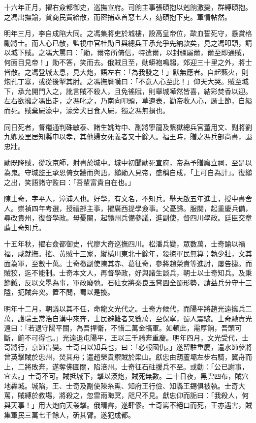 \begin{pinyinscope}
{{十六年正月，擢右僉都御史，巡撫宣府。司餉主事張碩抱以剋餉激變，群縛碩抱。之馮出撫諭，貸商民貲給散，而密捕誅首惡七人，劾碩抱下吏。軍情帖然。

明年三月，李自成陷大同。之馮集將吏於城樓，設高皇帝位，歃血誓死守，懸賞格勵將士。而人心已散，監視中官杜勛且與總兵王承允爭先納款矣，見之馮叩頭，請以城下賊。之馮大罵曰：「勛，爾帝所倚信，特遣爾，以封疆屬爾，爾至即通賊，何面目見帝！」勛不答，笑而去。俄賊且至，勛蟒袍鳴騶，郊迎三十里之外，將士皆散。之馮登城太息，見大炮，語左右：「為我發之！」默無應者。自起爇火，則炮孔丁塞，或從後掣其肘。之馮撫膺嘆曰：「不意人心至此！」仰天大哭。賊至城下，承允開門入之，訛言賊不殺人，且免徭賦，則舉城嘩然皆喜，結彩焚香以迎。左右欲擁之馮出走，之馮叱之，乃南向叩頭，草遺表，勸帝收人心，厲士節，自縊而死。賊棄屍濠中，濠旁犬日食人屍，獨之馮無損也。

同日死者，督糧通判硃敏泰、諸生姚時中、副將寧龍及繫獄總兵官董用文、副將劉九卿及里居知縣申以孝，其他婦女死義者又十餘人。福王時，贈之馮兵部尚書，謚忠壯。

勛既降賊，從攻京師，射書於城中。城中初聞勛死宣府，帝為予贈廕立祠，至是以為鬼。守城監王承恩倚女牆而與語，縋勛入見帝，盛稱自成，「上可自為計」。復縋之出，笑語諸守監曰：「吾輩富貴自在也。」

陳士奇，字平人，漳浦人也。好學，有文名，不知兵。舉天啟五年進士，授中書舍人。崇禎四年考選，授禮部主事，擢廣西提學僉事。父憂歸。服闋，起重慶兵備，尋改貴州，復督學政。母憂闋，起贛州兵備參議，進副使，督四川學政。廷臣交章薦士奇知兵。

十五年秋，擢右僉都御史，代廖大奇巡撫四川。松潘兵變，眾數萬，士奇諭以禍福，咸就撫。搖、黃賊十三家，縱橫川東北十餘年，殺掠軍民無算；執少壯，文其面為軍，至數十萬。士奇檄副使陳其赤、葛征奇，參將趙榮貴等進討，屢告捷。而賊狡，迄不能制。士奇本文人，再督學政，好與諸生談兵，朝士以士奇知兵。及秉節鉞，反以文墨為事，軍政廢弛。石砫女將秦良玉嘗圖全蜀形勢，請益兵分守十三隘，扼賊奔突。置不問，蜀以是擾。

明年十二月，朝議以其不任，命龍文光代之。士奇方候代，而陽平將趙光遠擁兵二萬，護瑞王常浩自漢中來奔，士民避難者又數萬，至保寧，蜀人震駭。士奇馳責光遠曰：「若退守陽平關，為吾捍衛，不惜二萬金犒軍。如頓此，需厚餉，吾頭可斷，餉不可得也。」光遠退屯陽平，王以三千騎奔重慶。明年四月，文光受代，士奇將行，京師告變。士奇自以知兵也，曰：「必報國仇。」遂留駐重慶，遣水師參將曾英擊賊於忠州，焚其舟；遣趙榮貴禦賊於梁山。獻忠由葫蘆壩左步右騎，翼舟而上，二將敗奔，遂奪佛圖關，陷涪州。士奇征石砫援兵不至。或勸：「公已謝事，宜去。」士奇不可。賊抵城下，擊以滾炮，賊死無數。二十日夜，黑雲四布，賊穴地轟城。城陷，王、士奇及副使陳糸熏、知府王行儉、知縣王錫俱被執。士奇大罵，賊縛於教場，將殺之，忽雷雨晦冥，咫尺不見。獻忠仰而詬曰：「我殺人，何與天事！」用大炮向天叢擊。俄晴霽，遂肆僇。士奇罵不絕口而死，王亦遇害，賊集軍民三萬七千餘人，斫其臂。遂犯成都。

}}
\end{pinyinscope}
